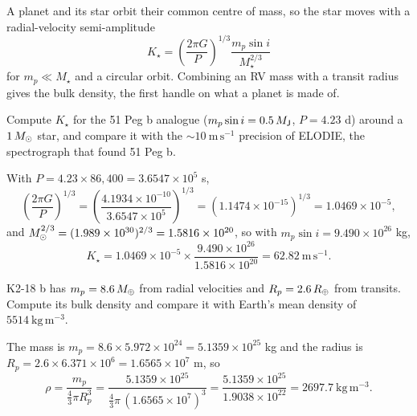 
A planet and its star orbit their common centre of mass, so the star moves with a radial-velocity semi-amplitude
\[
K_\star = \left(\frac{2\pi G}{P}\right)^{1/3} \frac{m_p \sin i}{M_\star^{2/3}}
\]
for $m_p \ll M_\star$ and a circular orbit.
Combining an RV mass with a transit radius gives the bulk density, the first handle on what a planet is made of.

\parti Compute $K_\star$ for the 51 Peg b analogue ($m_p \sin i = 0.5\,M_{\mathsf{J}}$, $P = 4.23$ d) around a $1\,M_{\odot}$ star, and compare it with the $\sim 10\ \mathrm{m\,s^{-1}}$ precision of ELODIE, the spectrograph that found 51 Peg b.

\begin{solution}
With $P = 4.23 \times 86{,}400 = 3.6547\times10^{5}$ s,
\[
\left(\frac{2\pi G}{P}\right)^{1/3}
= \left(\frac{4.1934\times10^{-10}}{3.6547\times10^{5}}\right)^{1/3}
= (1.1474\times10^{-15})^{1/3} = 1.0469\times10^{-5},
\]
and $M_{\odot}^{2/3} = (1.989\times10^{30})^{2/3} = 1.5816\times10^{20}$, so with $m_p \sin i = 9.490\times10^{26}$ kg,
\[
K_\star = 1.0469\times10^{-5} \times \frac{9.490\times10^{26}}{1.5816\times10^{20}} = 62.82\ \mathrm{m\,s^{-1}}.
\]
\end{solution}

\parti K2-18 b has $m_p = 8.6\,M_{\oplus}$ from radial velocities and $R_p = 2.6\,R_{\oplus}$ from transits. Compute its bulk density and compare it with Earth's mean density of $5514\ \mathrm{kg\,m^{-3}}$.

\begin{solution}
The mass is $m_p = 8.6 \times 5.972\times10^{24} = 5.1359\times10^{25}$ kg and the radius is $R_p = 2.6 \times 6.371\times10^{6} = 1.6565\times10^{7}$ m, so
\[
\rho = \frac{m_p}{\tfrac{4}{3}\pi R_p^3}
= \frac{5.1359\times10^{25}}{\tfrac{4}{3}\pi\,(1.6565\times10^{7})^3}
= \frac{5.1359\times10^{25}}{1.9038\times10^{22}} = 2697.7\ \mathrm{kg\,m^{-3}}.
\]
\end{solution}

